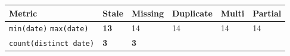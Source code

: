 \documentclass[
]{krantz}
\begin{document}
\begin{longtable}[]{@{}llllll@{}}
\toprule
\begin{minipage}[b]{0.14\columnwidth}\raggedright
Metric\strut
\end{minipage} & \begin{minipage}[b]{0.14\columnwidth}\raggedright
Stale\strut
\end{minipage} & \begin{minipage}[b]{0.14\columnwidth}\raggedright
Missing\strut
\end{minipage} & \begin{minipage}[b]{0.14\columnwidth}\raggedright
Duplicate\strut
\end{minipage} & \begin{minipage}[b]{0.14\columnwidth}\raggedright
Multi\strut
\end{minipage} & \begin{minipage}[b]{0.14\columnwidth}\raggedright
Partial\strut
\end{minipage}\tabularnewline
\midrule
\endhead
\begin{minipage}[t]{0.14\columnwidth}\raggedright
\texttt{min(date)} \texttt{max(date)}\strut
\end{minipage} & \begin{minipage}[t]{0.14\columnwidth}\raggedright
\textbf{13}\strut
\end{minipage} & \begin{minipage}[t]{0.14\columnwidth}\raggedright
14\strut
\end{minipage} & \begin{minipage}[t]{0.14\columnwidth}\raggedright
14\strut
\end{minipage} & \begin{minipage}[t]{0.14\columnwidth}\raggedright
14\strut
\end{minipage} & \begin{minipage}[t]{0.14\columnwidth}\raggedright
14\strut
\end{minipage}\tabularnewline
\begin{minipage}[t]{0.14\columnwidth}\raggedright
\texttt{count(distinct\ date)}\strut
\end{minipage} & \begin{minipage}[t]{0.14\columnwidth}\raggedright
\textbf{3}\strut
\end{minipage} & \begin{minipage}[t]{0.14\columnwidth}\raggedright
\textbf{3}\strut
\end{minipage} & \begin{minipage}[t]{0.14\columnwidth}\raggedright

\end{minipage}
\end{longtable}
\end{document}
